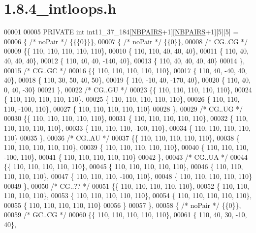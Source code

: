 \hypertarget{1_88_84__intloops_8h_source}{}\section{1.8.4\+\_\+intloops.h}
\label{1_88_84__intloops_8h_source}

\begin{DoxyCode}
00001 
00005 PRIVATE \textcolor{keywordtype}{int} int11\_37\_184[\hyperlink{energy__const_8h_a5e75221c779d618eab81e096f37e32ce}{NBPAIRS}+1][\hyperlink{energy__const_8h_a5e75221c779d618eab81e096f37e32ce}{NBPAIRS}+1][5][5] =
00006 \{ \textcolor{comment}{/* noPair */} \{\{\{0\}\}\},
00007 \{ \textcolor{comment}{/* noPair */} \{\{0\}\},
00008 \textcolor{comment}{/* CG..CG */}
00009 \{\{ 110, 110, 110, 110, 110\},
00010 \{ 110, 110,  40,  40,  40\},
00011 \{ 110,  40,  40,  40,  40\},
00012 \{ 110,  40,  40, -140,  40\},
00013 \{ 110,  40,  40,  40,  40\}
00014 \},
00015 \textcolor{comment}{/* CG..GC */}
00016 \{\{ 110, 110, 110, 110, 110\},
00017 \{ 110,  40, -40,  40,  40\},
00018 \{ 110,  30,  50,  40,  50\},
00019 \{ 110, -10,  40, -170,  40\},
00020 \{ 110,  40,   0,  40, -30\}
00021 \},
00022 \textcolor{comment}{/* CG..GU */}
00023 \{\{ 110, 110, 110, 110, 110\},
00024 \{ 110, 110, 110, 110, 110\},
00025 \{ 110, 110, 110, 110, 110\},
00026 \{ 110, 110, 110, -100, 110\},
00027 \{ 110, 110, 110, 110, 110\}
00028 \},
00029 \textcolor{comment}{/* CG..UG */}
00030 \{\{ 110, 110, 110, 110, 110\},
00031 \{ 110, 110, 110, 110, 110\},
00032 \{ 110, 110, 110, 110, 110\},
00033 \{ 110, 110, 110, -100, 110\},
00034 \{ 110, 110, 110, 110, 110\}
00035 \},
00036 \textcolor{comment}{/* CG..AU */}
00037 \{\{ 110, 110, 110, 110, 110\},
00038 \{ 110, 110, 110, 110, 110\},
00039 \{ 110, 110, 110, 110, 110\},
00040 \{ 110, 110, 110, -100, 110\},
00041 \{ 110, 110, 110, 110, 110\}
00042 \},
00043 \textcolor{comment}{/* CG..UA */}
00044 \{\{ 110, 110, 110, 110, 110\},
00045 \{ 110, 110, 110, 110, 110\},
00046 \{ 110, 110, 110, 110, 110\},
00047 \{ 110, 110, 110, -100, 110\},
00048 \{ 110, 110, 110, 110, 110\}
00049 \},
00050 \textcolor{comment}{/* CG..?? */}
00051 \{\{ 110, 110, 110, 110, 110\},
00052 \{ 110, 110, 110, 110, 110\},
00053 \{ 110, 110, 110, 110, 110\},
00054 \{ 110, 110, 110, 110, 110\},
00055 \{ 110, 110, 110, 110, 110\}
00056 \}
00057 \},
00058 \{ \textcolor{comment}{/* noPair */} \{\{0\}\},
00059 \textcolor{comment}{/* GC..CG */}
00060 \{\{ 110, 110, 110, 110, 110\},
00061 \{ 110,  40,  30, -10,  40\},

\end{DoxyCode}
